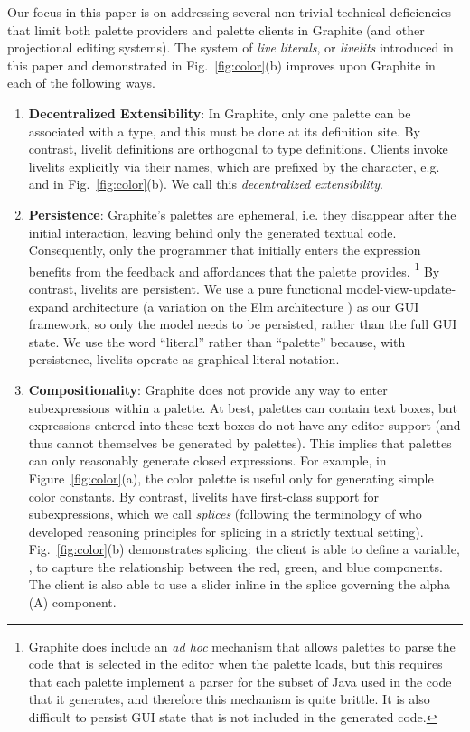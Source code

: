 Our focus in this paper is on addressing several non-trivial technical
deficiencies that limit both palette providers and palette clients in Graphite
(and other projectional editing systems).
The system of \emph{live literals}, or \emph{livelits} introduced in
this paper and demonstrated in Fig.~\ref{fig:color}(b) improves upon Graphite
in each of the following ways.
\begin{enumerate}
  \setlength\itemsep{0.5em}
  \item \textbf{Decentralized Extensibility}:
    In Graphite, only one palette can be associated with a type, and this must
    be done at its definition site.
    By contrast, livelit definitions are orthogonal to type definitions.
    Clients invoke livelits explicitly via their names, which are prefixed by the \li{\$} character,
    e.g.  and  in Fig.~\ref{fig:color}(b).
    We call this \emph{decentralized extensibility}.
  \item \textbf{Persistence}: Graphite's palettes are {ephemeral},
  i.e. they disappear after the initial interaction,
  leaving behind only the generated textual code.
  Consequently, only the programmer that initially enters the expression
  benefits from the feedback and affordances that the palette provides.%
  \footnote{Graphite does include an \emph{ad hoc} mechanism that
  allows palettes to parse the code that is selected in the editor
  when the palette loads, but this requires that each palette implement
  a parser for the subset of Java used in the code that it generates,
  and therefore this mechanism is quite brittle. It is also difficult
  to persist GUI state that is not included in the generated code.}
  By contrast, livelits are persistent. We use a pure functional model-view-update-expand architecture
  (a variation on the Elm architecture \cite{ElmArchitecture}) as our GUI framework,
  so only the model needs to be persisted, rather than the full GUI state.
  We use the word ``literal'' rather than ``palette'' because, with persistence, livelits
  operate as graphical literal notation.

  \item \textbf{Compositionality}:
  Graphite does not provide any way to {enter subexpressions within a palette}.
  At best, palettes can contain text boxes, but expressions entered into these text boxes
  do not have any editor support (and thus cannot themselves be generated by palettes).
  This implies that palettes can only reasonably generate {closed expressions}.
  For example, in Figure~\ref{fig:color}(a), the color palette
  is useful only for generating simple color constants.
  By contrast, livelits have first-class support for subexpressions, which we call \emph{splices} (following
  the terminology of \citet{TLMs} who developed reasoning principles for splicing in a strictly textual setting).
  Fig.~\ref{fig:color}(b) demonstrates splicing: the client is able to define a variable, ,
  to capture the relationship between the red, green, and blue components.
  The client is also able to use a slider inline in the splice governing
  the alpha (A) component.


\end{enumerate}
